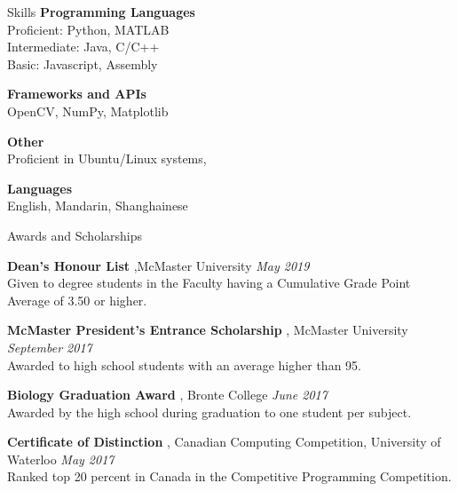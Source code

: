 \documentclass{resume} %
\begin{document}
\begin{rSection}{Skills}
{\bf Programming Languages }
\\Proficient: Python, MATLAB
\\Intermediate: Java, C/C++
\\Basic: Javascript, Assembly

{\bf Frameworks and APIs}
\\OpenCV, NumPy, Matplotlib

{\bf Other} \\
Proficient in Ubuntu/Linux systems, 

{\bf Languages} \\
English, Mandarin, Shanghainese
\end{rSection}

\begin{rSection}{Awards and Scholarships} 

{\bf Dean's Honour List}{ ,McMaster University
} \hfill{\em May 2019} \\
Given to degree students in the Faculty having a Cumulative Grade Point Average of 3.50 or higher.

{\bf McMaster President's Entrance Scholarship}{ , McMaster University
} \hfill{\em September 2017} \\
Awarded to high school students with an average higher than 95.

{\bf Biology Graduation Award}{ , Bronte College
} \hfill{\em June 2017}
\\Awarded by the high school during graduation to one student per subject.

{\bf Certificate of Distinction}{ , Canadian Computing Competition, University of Waterloo
} \hfill{\em May 2017}
\\Ranked top 20 percent in Canada in the Competitive Programming Competition.



\end{rSection}
\end{document}
